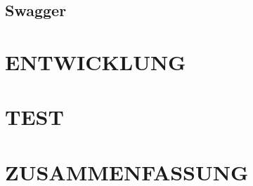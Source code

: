 \documentclass[a4paper,twoside]{article}
\begin{document}
	\subsection{Swagger}
	
	\section{\uppercase{Entwicklung}}
	
	\section{\uppercase{Test}}
	
	\section{\uppercase{Zusammenfassung}}
	
	
	
	\small
	
\end{document}
